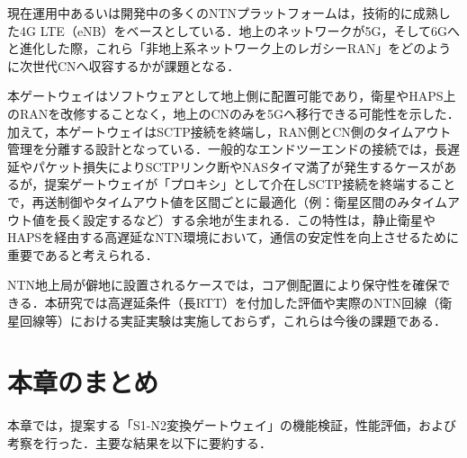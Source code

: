 現在運用中あるいは開発中の多くのNTNプラットフォームは，技術的に成熟した4G LTE（eNB）をベースとしている．地上のネットワークが5G，そして6Gへと進化した際，これら「非地上系ネットワーク上のレガシーRAN」をどのように次世代CNへ収容するかが課題となる．

本ゲートウェイはソフトウェアとして地上側に配置可能であり，衛星やHAPS上のRANを改修することなく，地上のCNのみを5Gへ移行できる可能性を示した．加えて，本ゲートウェイはSCTP接続を終端し，RAN側とCN側のタイムアウト管理を分離する設計となっている．一般的なエンドツーエンドの接続では，長遅延やパケット損失によりSCTPリンク断やNASタイマ満了が発生するケースがあるが，提案ゲートウェイが「プロキシ」として介在しSCTP接続を終端することで，再送制御やタイムアウト値を区間ごとに最適化（例：衛星区間のみタイムアウト値を長く設定するなど）する余地が生まれる．この特性は，静止衛星やHAPSを経由する高遅延なNTN環境において，通信の安定性を向上させるために重要であると考えられる．

NTN地上局が僻地に設置されるケースでは，コア側配置により保守性を確保できる．本研究では高遅延条件（長RTT）を付加した評価や実際のNTN回線（衛星回線等）における実証実験は実施しておらず，これらは今後の課題である．

\section{本章のまとめ}

本章では，提案する「S1-N2変換ゲートウェイ」の機能検証，性能評価，および考察を行った．主要な結果を以下に要約する．

